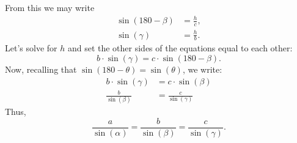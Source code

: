 \documentclass[noauthor,nooutcomes,12pt]{ximera}
\begin{document}
\begin{question}
\begin{freeResponse}
\begin{center}
    \end{center}
    From this we may write
    \begin{align*}
      \sin(180-\beta) &= \frac{h}{c},\\
      \sin(\gamma) &= \frac{h}{b}.
    \end{align*}
    Let's solve for $h$ and set the other sides of the equations equal
    to each other:
    \[
    b\cdot\sin(\gamma) = c\cdot \sin(180-\beta).
    \]
    Now, recalling that $\sin(180-\theta) = \sin(\theta)$, we write:
    \begin{align*}
      b\cdot\sin(\gamma) &= c\cdot \sin(\beta)\\
      \frac{b}{\sin(\beta)} &= \frac{c}{\sin(\gamma)}
    \end{align*}
    Thus,
    \[
    \frac{a}{\sin(\alpha)} = \frac{b}{\sin(\beta)} = \frac{c}{\sin(\gamma)}.
    \]
  \end{freeResponse}
\end{question}
\mynewpage
\end{document}

